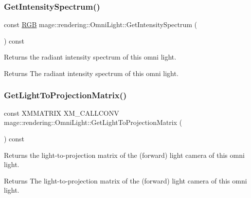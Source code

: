 \subsubsection{\texorpdfstring{Get\+Intensity\+Spectrum()}{GetIntensitySpectrum()}}
{\footnotesize\ttfamily const \hyperlink{structmage_1_1_r_g_b}{R\+GB} mage\+::rendering\+::\+Omni\+Light\+::\+Get\+Intensity\+Spectrum (\begin{DoxyParamCaption}{ }\end{DoxyParamCaption}) const\hspace{0.3cm}{\ttfamily [noexcept]}}

Returns the radiant intensity spectrum of this omni light.

\begin{DoxyReturn}{Returns}
The radiant intensity spectrum of this omni light. 
\end{DoxyReturn}
\hypertarget{classmage_1_1rendering_1_1_omni_light_aa93d9722b3480fc9997761af89a6d90d}{}\label{classmage_1_1rendering_1_1_omni_light_aa93d9722b3480fc9997761af89a6d90d} 
\subsubsection{\texorpdfstring{Get\+Light\+To\+Projection\+Matrix()}{GetLightToProjectionMatrix()}}
{\footnotesize\ttfamily const X\+M\+M\+A\+T\+R\+IX X\+M\+\_\+\+C\+A\+L\+L\+C\+O\+NV mage\+::rendering\+::\+Omni\+Light\+::\+Get\+Light\+To\+Projection\+Matrix (\begin{DoxyParamCaption}{ }\end{DoxyParamCaption}) const\hspace{0.3cm}{\ttfamily [noexcept]}}

Returns the light-\/to-\/projection matrix of the (forward) light camera of this omni light.

\begin{DoxyReturn}{Returns}
The light-\/to-\/projection matrix of the (forward) light camera of this omni light. 
\end{DoxyReturn}
\hypertarget{classmage_1_1rendering_1_1_omni_light_a43c6be5649668705ffb1ace363960b00}{}\label{classmage_1_1rendering_1_1_omni_light_a43c6be5649668705ffb1ace363960b00} 
